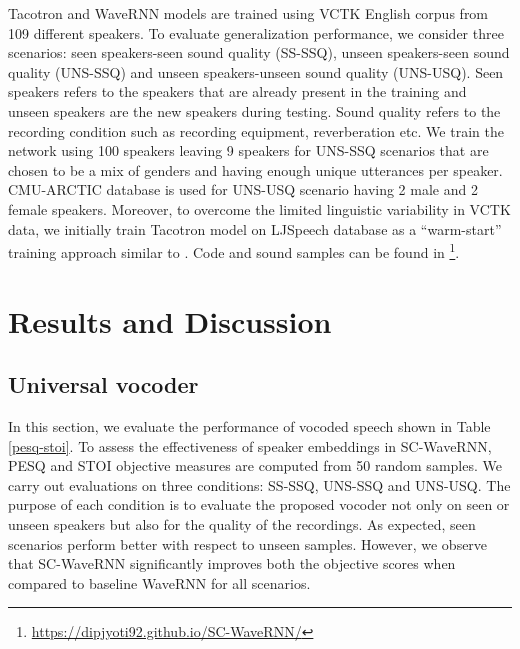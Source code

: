 \documentclass[a4paper]{article}
\begin{document}
Tacotron and WaveRNN models are trained using VCTK English corpus \cite{christophe2016cstr} from 109 different speakers. To evaluate generalization performance, we consider three scenarios: seen speakers-seen sound quality (SS-SSQ), unseen speakers-seen sound quality (UNS-SSQ) and unseen speakers-unseen sound quality (UNS-USQ). Seen speakers refers to the speakers that are already present in the training and unseen speakers are the new speakers during testing. Sound quality refers to the recording condition such as recording equipment, reverberation etc. We train the network using 100 speakers leaving 9 speakers for UNS-SSQ scenarios that are chosen to be a mix of genders and having enough unique utterances per speaker. CMU-ARCTIC database \cite{kominek2004cmu} is used for UNS-USQ scenario having 2 male and 2 female speakers. Moreover, to overcome the limited linguistic variability in VCTK data, we initially train Tacotron model on LJSpeech database as a ``warm-start'' training approach similar to \cite{cooper2019zero}. Code and sound samples can be found in \footnote{\url{https://dipjyoti92.github.io/SC-WaveRNN/}}.
\vspace{-2mm}
\section{Results and Discussion}
\subsection{Universal vocoder}
In this section, we evaluate the performance of vocoded speech shown in Table \ref{pesq-stoi}. To assess the effectiveness of speaker embeddings in SC-WaveRNN, PESQ and STOI objective measures are computed from 50 random samples. We carry out evaluations on three conditions: SS-SSQ, UNS-SSQ and UNS-USQ. The purpose of each condition is to evaluate the proposed vocoder not only on seen or unseen speakers but also for the quality of the recordings. As expected, seen scenarios perform better with respect to unseen samples. However, we observe that SC-WaveRNN significantly improves both the objective scores when compared to baseline WaveRNN for all scenarios.
\end{document}
